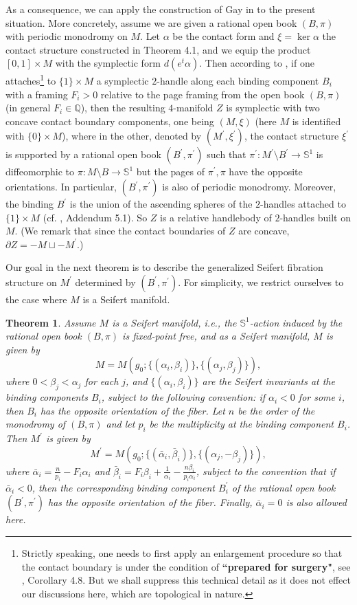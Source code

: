 \documentclass[11pt]{amsart}
\theoremstyle{plain}
\newtheorem{theorem}{Theorem}
\numberwithin{theorem}{section}
\theoremstyle{definition}
\newcommand{\Q}{{\mathbb Q}}
\newcommand{\s}{{\mathbb S}}
\begin{document}
As a consequence, we can apply the construction of Gay in \cite{G} to the present situation. 
More concretely, assume we are given a rational open book $(B,\pi)$ with periodic monodromy on $M$. Let $\alpha$ be the contact form and $\xi=\ker\alpha$ the contact structure constructed in Theorem 4.1, and we equip the product $[0,1]\times M$ with the symplectic form $d(e^t\alpha)$. 
Then according to \cite{G}, if one attaches\footnote{Strictly speaking, one needs to first apply an enlargement procedure so that the contact boundary is under the condition of {\bf ``prepared for surgery"}, see \cite{G}, Corollary 4.8. But we shall suppress this technical detail as it does not effect our discussions here, which are topological in nature.}
to $\{1\}\times M$ a symplectic $2$-handle along each binding component $B_i$ with a framing $F_i>0$ relative to the page framing from the open book $(B,\pi)$ (in general $F_i\in\Q$), 
then the resulting $4$-manifold $Z$ is symplectic with two concave contact boundary components,
one being $(M,\xi)$ (here $M$ is identified with $\{0\}\times M$), where in the other, denoted by 
$(M^\prime,\xi^\prime)$, the contact structure $\xi^\prime$ is supported by a rational open book 
$(B^\prime,\pi^\prime)$ such that $\pi^\prime: M^\prime\setminus B^\prime \rightarrow \s^1$ is diffeomorphic to $\pi: M\setminus B \rightarrow \s^1$ but the pages of $\pi^\prime,\pi$ have the opposite orientations. In particular, $(B^\prime,\pi^\prime)$ is also of periodic monodromy. Moreover, the binding $B^\prime$ is the union of the ascending spheres of the $2$-handles attached to 
$\{1\}\times M$ (cf.  \cite{G}, Addendum 5.1). So $Z$ is a relative handlebody of $2$-handles built on
$M$. (We remark that since the contact boundaries of $Z$ are concave, $\partial Z=-M\sqcup -M^\prime$.)

Our goal in the next theorem is to describe the generalized Seifert fibration structure on $M^\prime$ determined by $(B^\prime,\pi^\prime)$. For simplicity, we restrict ourselves to the case where $M$
is a Seifert manifold. 

\begin{theorem}
Assume $M$ is a Seifert manifold, i.e., the $\s^1$-action induced by the rational open book 
$(B,\pi)$ is fixed-point free, and as a Seifert manifold, $M$ is given by 
$$
M=M(g_0; \{(\alpha_i,\beta_i)\}, \{(\alpha_j,\beta_j)\}),
$$
where $0<\beta_j<\alpha_j$ for each $j$, and $\{(\alpha_i,\beta_i)\}$ are the Seifert invariants at
the binding components $B_i$, subject to the following convention: if $\alpha_i<0$ for some $i$, 
then $B_i$ has the opposite orientation of the fiber.  Let $n$ be the order of the monodromy of 
$(B,\pi)$ and let $p_i$ be the multiplicity at the binding component $B_i$. 
Then $M^\prime$ is given by
$$
M^\prime=M(g_0; \{(\bar{\alpha}_i,\bar{\beta}_i)\}, \{(\alpha_j,-\beta_j)\}),
$$
where $\bar{\alpha}_i=\frac{n}{p_i}-F_i\alpha_i$ and 
$\bar{\beta}_i=F_i\beta_i+\frac{1}{\alpha_i}-\frac{n\beta_i}{p_i\alpha_i}$, subject to the convention that
if $\bar{\alpha}_i<0$, then the corresponding binding component $B_i^\prime$ of the rational open 
book $(B^\prime,\pi^\prime)$ has the opposite orientation of the fiber. Finally, $\bar{\alpha}_i=0$
is also allowed here.  
\end{theorem}
\end{document}
